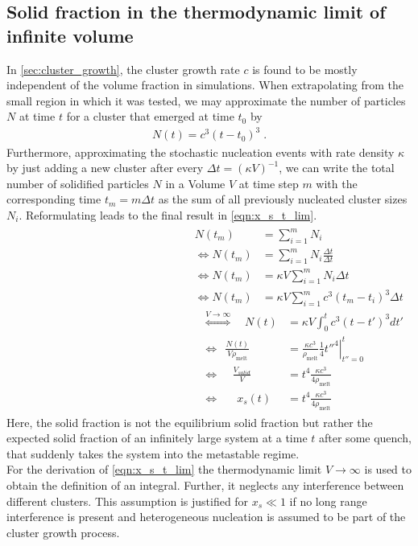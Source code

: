 \subsection{Solid fraction in the thermodynamic limit of infinite volume}
\label{sec:inf_vol_limit_nuc_rate}
In \autoref{sec:cluster_growth}, the cluster growth rate $c$ is found to be mostly independent of the volume fraction in simulations. When extrapolating from the small region in which it was tested, we may approximate the number of particles $N$ at time $t$ for a cluster that emerged at time $t_0$ by
\begin{align}
\label{eqn:simple_growth}
N(t) = c^3 (t-t_0)^3 \; \text{.}
\end{align} 
Furthermore, approximating the stochastic nucleation events with rate density $\kappa$ by just adding a new cluster after every $\Delta t = (\kappa V)^{-1}$, we can write the total number of solidified particles $N$ in a Volume $V$ at time step $m$ with the corresponding time $t_m = m \Delta t$ as the sum of all previously nucleated cluster sizes $N_i$. Reformulating leads to the final result in \autoref{eqn:x_s_t_lim}.
\begin{align}
\begin{split}
N(t_m)&=\sum_{i=1}^m N_i\\
\Leftrightarrow N(t_m)&=\sum_{i=1}^m N_i \frac{\Delta t}{\Delta t}\\
\Leftrightarrow N(t_m)&=\kappa V \sum_{i=1}^m N_i \Delta t\\
\Leftrightarrow N(t_m)&=\kappa V \sum_{i=1}^m c^3 (t_m-t_i)^3 \Delta t
\end{split}
\begin{split}
\label{eqn:x_s_t_lim}
\stackrel{V \rightarrow \infty } {\Leftrightarrow} \quad N(t)&=\kappa V \int_0^{t} c^3 (t - t')^3 d t'\\
\Leftrightarrow \; \, \frac{N(t)}{V \rho_{\text{melt}}}&=\frac{\kappa c^3}{\rho_{\text{melt}}} \left. \frac{1}{4}t''^4 \right|_{t''=0}^t\\
\Leftrightarrow \; \; \; \; \frac{V_{solid}}{V} &= t^4 \frac{\kappa c^3}{4 \rho_{\text{melt}}}\\
\Leftrightarrow \quad \; \: x_s(t)&= t^4 \frac{\kappa c^3}{4 \rho_{\text{melt}}}
\end{split}
\end{align}
Here, the solid fraction is not the equilibrium solid fraction but rather the expected solid fraction of an infinitely large system at a time $t$ after some quench, that suddenly takes the system into the metastable regime.\\ 
For the derivation of \autoref{eqn:x_s_t_lim} the thermodynamic limit $V\rightarrow \infty$ is used to obtain the definition of an integral. Further, it neglects any interference between different clusters. This assumption is justified for $x_s \ll 1$ if no long range interference is present and heterogeneous nucleation is assumed to be part of the cluster growth process.\\

